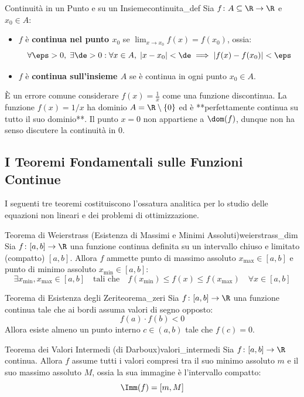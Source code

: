\begin{definizione}{Continuità in un Punto e su un Insieme}{continuita_def}
Sia $f \colon A \subseteq \R \to \R$ e $x_0 \in A$:
\begin{itemize}
    \item $f$ è \textbf{continua nel punto $x_0$} se $\lim_{x \to x_0} f(x) = f(x_0)$, ossia:
    \[
        \forall \eps > 0, \; \exists \de > 0 : \forall x \in A, \; |x - x_0| < \de \implies |f(x) - f(x_0)| < \eps
    \]
    \item $f$ è \textbf{continua sull'insieme $A$} se è continua in ogni punto $x_0 \in A$.
\end{itemize}
\end{definizione}

\begin{esame}
È un errore comune considerare $f(x) = \frac{1}{x}$ come una funzione discontinua.
La funzione $f(x) = 1/x$ ha dominio $A = \R \setminus \{0\}$ ed è **perfettamente continua su tutto il suo dominio**. Il punto $x = 0$ non appartiene a $\dom(f)$, dunque non ha senso discutere la continuità in $0$.
\end{esame}

\subsection{I Teoremi Fondamentali sulle Funzioni Continue}
I seguenti tre teoremi costituiscono l'ossatura analitica per lo studio delle equazioni non lineari e dei problemi di ottimizzazione.

\begin{teorema}{Teorema di Weierstrass (Esistenza di Massimi e Minimi Assoluti)}{weierstrass_dim}
Sia $f \colon [a, b] \to \R$ una funzione continua definita su un intervallo chiuso e limitato (compatto) $[a, b]$.
Allora $f$ ammette punto di massimo assoluto $x_{\max} \in [a, b]$ e punto di minimo assoluto $x_{\min} \in [a, b]$:
\[
    \exists x_{\min}, x_{\max} \in [a, b] \quad \text{tali che} \quad f(x_{\min}) \le f(x) \le f(x_{\max}) \quad \forall x \in [a, b]
\]
\end{teorema}

\begin{teorema}{Teorema di Esistenza degli Zeri}{teorema_zeri}
Sia $f \colon [a, b] \to \R$ una funzione continua tale che ai bordi assuma valori di segno opposto:
\[
    f(a) \cdot f(b) < 0
\]
Allora esiste almeno un punto interno $c \in (a, b)$ tale che $f(c) = 0$.
\end{teorema}

\begin{teorema}{Teorema dei Valori Intermedi (di Darboux)}{valori_intermedi}
Sia $f \colon [a, b] \to \R$ continua. Allora $f$ assume tutti i valori compresi tra il suo minimo assoluto $m$ e il suo massimo assoluto $M$, ossia la sua immagine è l'intervallo compatto:
\[
    \Imm(f) = [m, M]
\]
\end{teorema}
